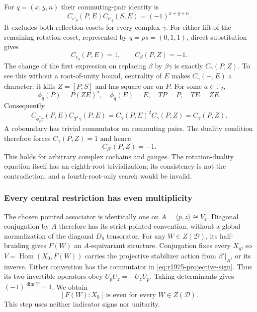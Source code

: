 For $q=(x,y,n)$ their commuting-pair identity is
\[
 C_{c'_q}(P,E)C_{c'_q}(S,E)=(-1)^{x+y+n}.
\]
It excludes both reflection cosets for every complex $\gamma$.
For either lift of the remaining rotation coset, represented by
$q=ps=(0,1,1)$, direct substitution gives
\[
 C_{c_q}(P,E)=1,\qquad C_\beta(P,Z)=-1.
\]
The change of the first expression on replacing $\beta$ by $\beta\gamma$
is exactly $C_\gamma(P,Z)$. To see this without a root-of-unity bound,
centrality of $E$ makes $C_\gamma(-,E)$ a character; it kills $Z=[P,S]$
and has square one on $P$. For some $a\in\mathbb F_2$,
\[
 \phi_q(P)=P(ZE)^a,\quad\phi_q(E)=E,\quad TP=P,\quad TE=ZE.
\]
Consequently
\[
 C_{\phi_q^*\gamma}(P,E)C_{T^*\gamma}(P,E)
 =C_\gamma(P,E)^2 C_\gamma(P,Z)=C_\gamma(P,Z).
\]
A coboundary has trivial commutator on commuting pairs. The duality
condition therefore forces $C_\gamma(P,Z)=1$ and hence
\begin{equation}\label{eq:r1975-projective-sign}
 C_{\beta'}(P,Z)=-1.
\end{equation}
This holds for arbitrary complex cochains and gauges. The rotation-duality
equation itself has an eighth-root trivialization; its consistency is not
the contradiction, and a fourth-root-only search would be invalid.

\subsubsection{Every central restriction has even multiplicity}
The chosen pointed associator is identically one on
$A=\langle p,z\rangle\cong V_4$. Diagonal conjugation by $A$ therefore
has its strict pointed convention, without a global normalization of
the diagonal $D_8$ tensorator. For any $W\in Z(\mathcal D)$,
its half-braiding gives $F(W)$ an $A$-equivariant structure. Conjugation
fixes every $X_q$, so $V=\operatorname{Hom}(X_0,F(W))$ carries the
projective stabilizer action from $\beta'|_A$, or its inverse. Either
convention has the commutator in \eqref{eq:r1975-projective-sign}.
Thus its two invertible operators obey $U_pU_z=-U_zU_p$.
Taking determinants gives $(-1)^{\dim V}=1$. We obtain
\begin{equation}\label{eq:r1975-even-restriction}
 [F(W):X_0]\ \text{is even for every }W\in Z(\mathcal D).
\end{equation}
This step uses neither indicator signs nor unitarity.

